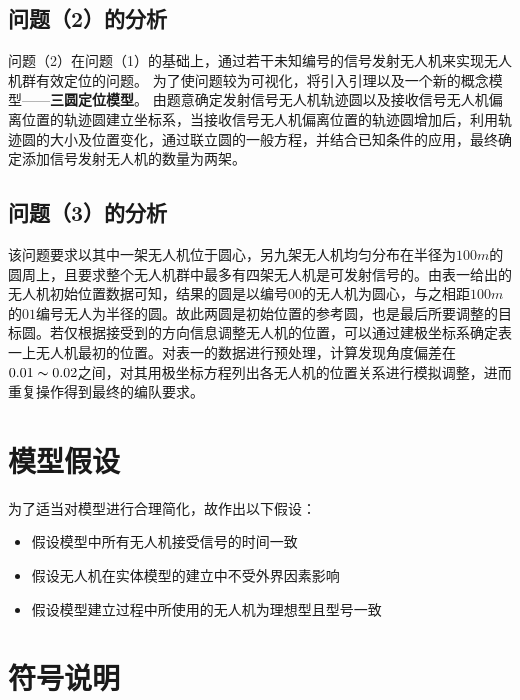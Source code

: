 \subsection{问题（2）的分析}

问题（2）在问题（1）的基础上，通过若干未知编号的信号发射无人机来实现无人机群有效定位的问题。
为了使问题较为可视化，将引入引理以及一个新的概念模型——\textbf{三圆定位模型}。
由题意确定发射信号无人机轨迹圆以及接收信号无人机偏离位置的轨迹圆建立坐标系，当接收信号无人机偏离位置的轨迹圆增加后，利用轨迹圆的大小及位置变化，通过联立圆的一般方程，并结合已知条件的应用，最终确定添加信号发射无人机的数量为两架。

\subsection{问题（3）的分析}

该问题要求以其中一架无人机位于圆心，另九架无人机均匀分布在半径为$100m$的圆周上，且要求整个无人机群中最多有四架无人机是可发射信号的。由表一给出的无人机初始位置数据可知，结果的圆是以编号$00$的无人机为圆心，与之相距$100m$的$01$编号无人为半径的圆。故此两圆是初始位置的参考圆，也是最后所要调整的目标圆。若仅根据接受到的方向信息调整无人机的位置，可以通过建极坐标系确定表一上无人机最初的位置。对表一的数据进行预处理，计算发现角度偏差在$0.01 \thicksim 0.02$之间，对其用极坐标方程列出各无人机的位置关系进行模拟调整，进而重复操作得到最终的编队要求。




\section{模型假设}

为了适当对模型进行合理简化，故作出以下假设：

\begin{itemize}
    \item 假设模型中所有无人机接受信号的时间一致
    \item 假设无人机在实体模型的建立中不受外界因素影响
    \item 假设模型建立过程中所使用的无人机为理想型且型号一致
\end{itemize}




\section{符号说明}

